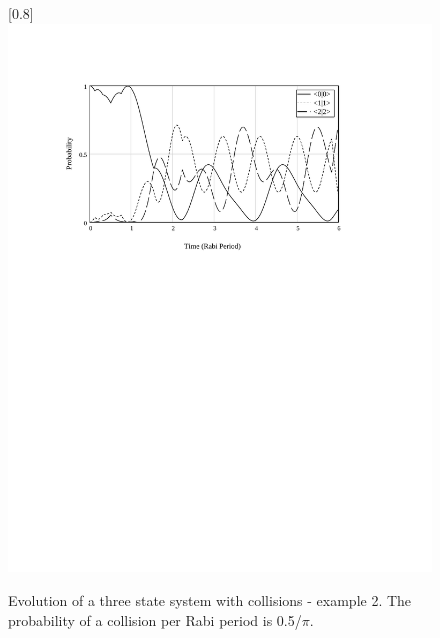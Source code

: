 \begin{figure}
\scalebox{0.8}[0.8]{
\includegraphics[bb=30 455 489 685]
{coll_2/coll_2.pdf}
}
\caption[Evolution of a three state system with collisions - example 2]{Evolution of a three state system with collisions - example 2. The probability of a collision per Rabi period is 0.5/$\pi$.}
\label{coll_2}
\end{figure}

